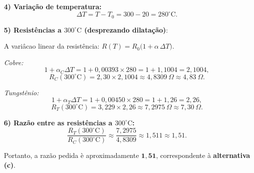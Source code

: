 \begin{flushleft}
\textbf{4) \; Varia\c{c}\~ao de temperatura:}
\[
\Delta T = T - T_0 = 300-20 = 280^\circ\text{C}.
\]

\bigskip

\textbf{5) \; Resist\^encias a $300^\circ\text{C}$ (desprezando dilata\c{c}\~ao)}:

A vari\^acao linear da resist\^encia: $R(T)=R_0\big(1+\alpha\,\Delta T\big)$.

\medskip

\emph{Cobre:}
\[
1+\alpha_C\Delta T = 1 + 0{,}00393\times280 = 1 + 1{,}1004 = 2{,}1004,
\]
\[
R_C(300^\circ\text{C}) = 2{,}30\times 2{,}1004 \approx 4{,}8309\ \Omega \approx 4{,}83\ \Omega.
\]

\medskip

\emph{Tungst\^enio:}
\[
1+\alpha_T\Delta T = 1 + 0{,}00450\times280 = 1 + 1{,}26 = 2{,}26,
\]
\[
R_T(300^\circ\text{C}) = 3{,}229\times 2{,}26 \approx 7{,}2975\ \Omega \approx 7{,}30\ \Omega.
\]

\bigskip

\textbf{6) \; Raz\~ao entre as resist\^encias a $300^\circ\text{C}$:}
\[
\frac{R_T(300^\circ\text{C})}{R_C(300^\circ\text{C})}
\approx \frac{7{,}2975}{4{,}8309} \approx 1{,}511 \approx \boxed{1{,}51}.
\]

\vspace{0.4cm}

\noindent Portanto, a raz\~ao pedida \`e aproximadamente \(\mathbf{1{,}51}\), correspondente \`a \textbf{alternativa (c)}.
\end{flushleft}


